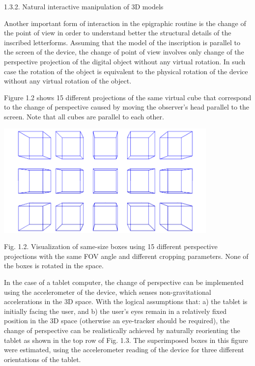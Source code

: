 \documentclass[amsthm,ebook]{saparticle}
\begin{document}
\bigskip

1.3.2. Natural interactive manipulation of 3D models 

Another important form of interaction in the epigraphic routine is the change of the point of view in order to
understand better the structural details of the inscribed letterforms. Assuming that the model of the inscription is
parallel to the screen of the device, the change of point of view involves only change of the perspective projection of
the digital object without any virtual rotation. In such case the rotation of the object is equivalent to the physical
rotation of the device without any virtual rotation of the object.

Figure 1.2 shows 15 different projections of the same virtual cube that correspond to the change of perspective caused
by moving the observer's head parallel to the screen. Note that all cubes are parallel to each other.


\bigskip

 \includegraphics[width=10.881cm,height=5.611cm]{EAGLE2016cameraready-img003.png} 

Fig. 1.2. Visualization of same-size boxes using 15 different perspective projections with the same FOV angle and
different cropping parameters. None of the boxes is rotated in the space. \ \ 


\bigskip

In the case of a tablet computer, the change of perspective can be implemented using the accelerometer of the device,
which senses non-gravitational accelerations in the 3D space. With the logical assumptions that: a) the tablet is
initially facing the user, and b) the user's eyes remain in a relatively fixed position in the 3D space (otherwise an
eye-tracker should be required), the change of perspective can be realistically achieved by naturally reorienting the
tablet as shown in the top row of Fig. 1.3. The superimposed boxes in this figure were estimated, using the
accelerometer reading of the device for three different orientations of the tablet. 
\end{document}
